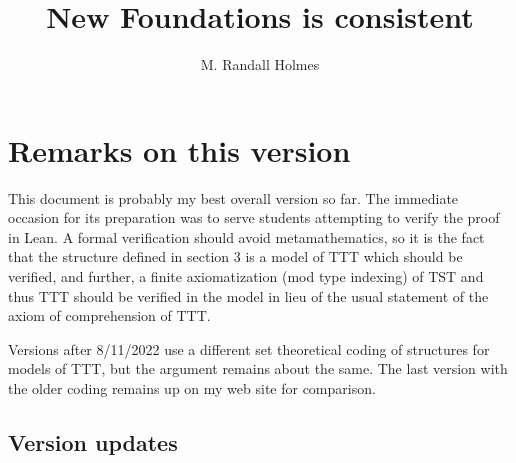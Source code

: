 \documentclass[112pt]{article}
\title{New Foundations is consistent}
\author{M. Randall Holmes}
\begin{document}
\maketitle

\tableofcontents

\newpage


\newpage

\section{Remarks on this version}

This document is probably my best overall version so far.  The immediate occasion for its preparation was to serve students attempting to verify the proof in Lean.  A formal verification should avoid metamathematics, so it is the fact that the structure defined in section 3 is a model of TTT which should be verified, and further, a finite axiomatization (mod type indexing) of TST and thus TTT should be verified in the model in lieu of the usual statement of the axiom of comprehension of TTT.

Versions after 8/11/2022 use a different set theoretical coding of structures for models of TTT, but the argument remains about the same.  The last version with the older coding remains up on my web site for comparison.


\subsection{Version updates}
\end{document}

